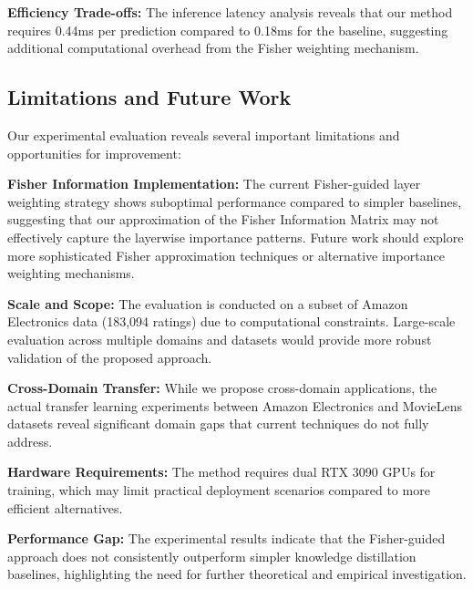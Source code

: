 \textbf{Efficiency Trade-offs:} The inference latency analysis reveals that our method requires 0.44ms per prediction compared to 0.18ms for the baseline, suggesting additional computational overhead from the Fisher weighting mechanism.



\subsection{Limitations and Future Work}

Our experimental evaluation reveals several important limitations and opportunities for improvement:

\textbf{Fisher Information Implementation:} The current Fisher-guided layer weighting strategy shows suboptimal performance compared to simpler baselines, suggesting that our approximation of the Fisher Information Matrix may not effectively capture the layerwise importance patterns. Future work should explore more sophisticated Fisher approximation techniques or alternative importance weighting mechanisms.

\textbf{Scale and Scope:} The evaluation is conducted on a subset of Amazon Electronics data (183,094 ratings) due to computational constraints. Large-scale evaluation across multiple domains and datasets would provide more robust validation of the proposed approach.

\textbf{Cross-Domain Transfer:} While we propose cross-domain applications, the actual transfer learning experiments between Amazon Electronics and MovieLens datasets reveal significant domain gaps that current techniques do not fully address.

\textbf{Hardware Requirements:} The method requires dual RTX 3090 GPUs for training, which may limit practical deployment scenarios compared to more efficient alternatives.

\textbf{Performance Gap:} The experimental results indicate that the Fisher-guided approach does not consistently outperform simpler knowledge distillation baselines, highlighting the need for further theoretical and empirical investigation.
